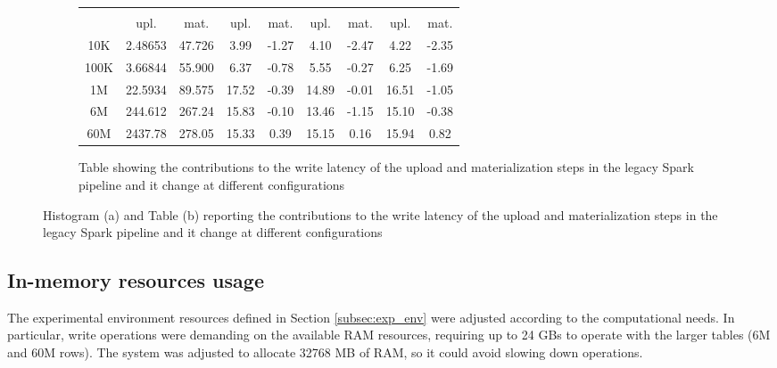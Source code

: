 \begin{figure}
    \begin{subfigure}[b]{\textwidth}
        \begin{tabular}{c c c c c c c c c} 
            \toprule
             &  &  &  & \\
            & upl. & mat. & upl. & mat. & upl. & mat. & upl. & mat.\\
            \midrule
            10K &  2.48653 & 47.726 & 3.99 & -1.27 & 4.10 & -2.47 & 4.22 & -2.35\\
            100K & 3.66844 & 55.900 & 6.37 & -0.78 & 5.55 & -0.27 & 6.25 & -1.69\\
            1M   & 22.5934 & 89.575 & 17.52 & -0.39 & 14.89 & -0.01 & 16.51 & -1.05\\
            6M   & 244.612 & 267.24 & 15.83 & -0.10 & 13.46 & -1.15 & 15.10 & -0.38\\
            60M &  2437.78 & 278.05 & 15.33 & 0.39 & 15.15 & 0.16 & 15.94 & 0.82\\
            \bottomrule
        \end{tabular}
        \caption{Table showing the contributions to the write latency of the upload and materialization steps in the legacy Spark pipeline and it change at different  configurations}
        \label{tbl:hudi_virtualiz_breakdown_cpu_perc}
    \end{subfigure}
    \caption{Histogram (a) and Table (b) reporting the contributions to the write latency of the upload and materialization steps in the legacy Spark pipeline and it change at different  configurations}
    \label{fig_tbl:hudi_virtualiz_breakdown}
\end{figure}

\subsection{In-memory resources usage}
\label{subsec:resources_usage}

The experimental environment resources defined in Section \ref{subsec:exp_env} were adjusted according to the computational needs. In particular, write operations were demanding on the available \gls{RAM} resources, requiring up to 24 GBs to operate with the larger tables (6M and 60M rows). The system was adjusted to allocate 32768 MB of \gls{RAM}, so it could avoid slowing down operations.